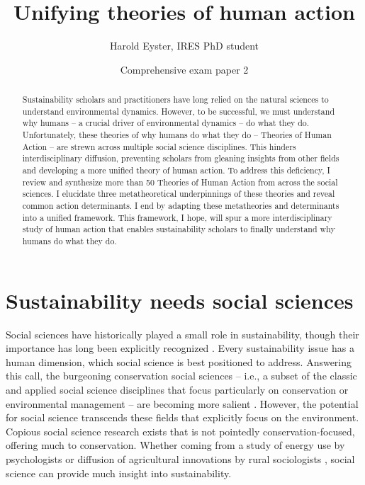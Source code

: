 \documentclass[12 pt]{article}
\title{\Huge Unifying theories of human action \\ \bigskip }
\author{\Large Harold Eyster, IRES PhD student}
\date{Comprehensive exam paper 2}
\begin{document}
	\maketitle
\color {black}

\begin{abstract}
Sustainability scholars and practitioners have long relied on the natural sciences to understand environmental dynamics. However, to be successful, we must understand why humans -- a crucial driver of environmental dynamics --  do what they do. Unfortunately, these theories of why humans do what they do -- Theories of Human Action -- are strewn across multiple social science disciplines. This hinders interdisciplinary diffusion, preventing scholars from gleaning insights from other fields and developing a more unified theory of human action. To address this deficiency, I review and synthesize more than 50 Theories of Human Action from across the social sciences. I elucidate three metatheoretical underpinnings of these theories and reveal common action determinants. I end by adapting these metatheories and determinants into a unified framework. This framework, I hope, will spur a more interdisciplinary study of human action that enables sustainability scholars to finally understand why humans do what they do.   
\end{abstract}
\section{Sustainability needs social sciences}
Social sciences have historically played a small role in sustainability, though their importance  has long been explicitly recognized \parencite{Leopold1949}. Every sustainability issue has a human dimension, which social science is best positioned to address. Answering this call, the burgeoning conservation social sciences -- i.e., a subset of the classic and applied social science disciplines that focus particularly on conservation or environmental management -- are becoming more salient \parencite{Bennett2017,Teel2018}. However, the potential for social science transcends these fields that explicitly focus on the environment.  Copious social science research exists that is not pointedly conservation-focused, offering much to conservation. Whether coming from a study of energy use by psychologists \parencite{Schultz2007,Schultz2018} or diffusion of agricultural innovations by rural sociologists \parencite{Rogers2010,Mascia2018}, social science can provide much insight into sustainability. 
\end{document}
